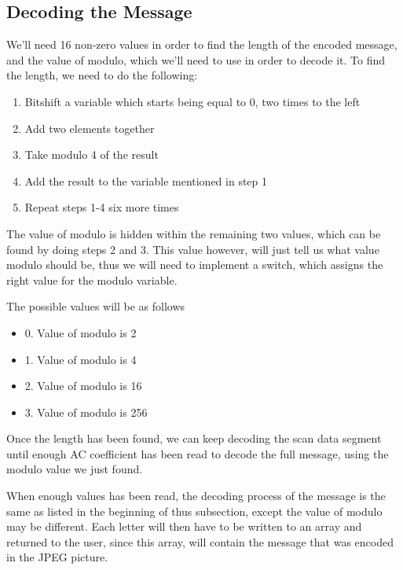 \subsection*{Decoding the Message}
We'll need 16 non-zero values in order to find the length of the encoded message, and the value of modulo, which we'll need to use in order to decode it. To find the length, we need to do the following:
\begin{enumerate}
	\item Bitshift a variable which starts being equal to 0, two times to the left
	\item Add two elements together
	\item Take modulo 4 of the result
	\item Add the result to the variable mentioned in step 1
	\item Repeat steps 1-4 six more times
\end{enumerate}
The value of modulo is hidden within the remaining two values, which can be found by doing steps 2 and 3. This value however, will just tell us what value modulo should be, thus we will need to implement a switch, which assigns the right value for the modulo variable.

The possible values will be as follows
\begin{itemize}
	\item 0. Value of modulo is 2
	\item 1. Value of modulo is 4
	\item 2. Value of modulo is 16
	\item 3. Value of modulo is 256
\end{itemize}
Once the length has been found, we can keep decoding the scan data segment until enough AC coefficient has been read to decode the full message, using the modulo value we just found.

When enough values has been read, the decoding process of the message is the same as listed in the beginning of thus subsection, except the value of modulo may be different. 
Each letter will then have to be written to an array and returned to the user, since this array, will contain the message that was encoded in the JPEG picture.